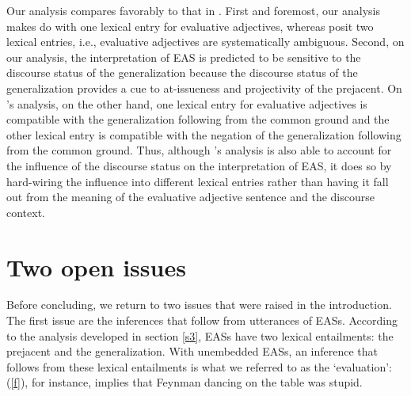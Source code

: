 \documentclass[11pt,fleqn]{article}
\newcommand{\6}{\mbox{$[\hspace*{-.6mm}[$}}
\newcommand{\9}{\mbox{$]\hspace*{-.6mm}]$}}
\newcommand{\citepos}[1]{\citeauthor{#1}'s \citeyear{#1}}
\begin{document}
Our analysis compares favorably to that in \citealt{karttunen-etal2014}. First and foremost, our analysis makes do with one lexical entry for evaluative adjectives, whereas \citet{karttunen-etal2014} posit two lexical entries, i.e., evaluative adjectives are systematically ambiguous. Second, on our analysis, the interpretation of EAS is predicted to be sensitive to the discourse status of the generalization because the discourse status of the generalization provides a cue to at-issueness and projectivity of the prejacent. On \citepos{karttunen-etal2014} analysis, on the other hand, one lexical entry for evaluative adjectives is compatible with the generalization following from the common ground and the other lexical entry is compatible with the negation of the generalization following from the common ground. Thus, although \citepos{karttunen-etal2014} analysis is also able to account for the influence of the discourse status on the interpretation of EAS, it does so by hard-wiring the influence into  different lexical entries rather than having it fall out from the meaning of the evaluative adjective sentence and the discourse context. 

\section{Two open issues}\label{s5}

Before concluding, we return to two issues that were raised in the introduction. The first issue are the inferences that follow from utterances of EASs. According to the analysis developed in section \ref{s3}, EASs have two lexical entailments: the prejacent and the generalization. With unembedded EASs, an inference that follows from these lexical entailments is what we referred to as the `evaluation': (\ref{f}), for instance, implies that Feynman dancing on the table was stupid. 
\end{document}
